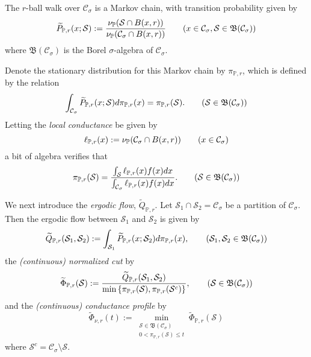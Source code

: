 \documentclass{article}
\newcommand{\set}[1]{\left\{#1\right\}}
\newcommand{\Cset}{\mathcal{C}}
\newcommand{\Sset}{\mathcal{S}}
\newcommand{\Csig}{\Cset_{\sigma}}
\newcommand{\Pbb}{\mathbb{P}}
\newcommand{\1}{\mathbf{1}}
\theoremstyle{alden}
\theoremstyle{aldenthm}
\theoremstyle{remark}
\begin{document}
The $r$-ball walk over $\Csig$ is a Markov chain, with transition probability given by 
\begin{equation*}
\widetilde{P}_{\Pbb,r}(x; \Sset) := \frac{\nu_{\Pbb}(\Sset \cap B(x,r))}{\nu_{\Pbb}(\Csig \cap B(x,r))} \tag{$x \in \Csig, \Sset \in \mathfrak{B}(\Csig)$}
\end{equation*}
where $\mathfrak{B}(\Csig)$ is the Borel $\sigma$-algebra of $\Csig$. 

Denote the stationary distribution for this Markov chain by $\pi_{\Pbb,r}$, which is defined by the relation
\begin{equation*}
\int_{\Csig} \widetilde{P}_{\Pbb,r}(x; \Sset) d\pi_{\Pbb,r}(x) = \pi_{\Pbb,r}(\Sset).  \tag{$\Sset \in \mathfrak{B}(\Csig)$}
\end{equation*}
Letting the \emph{local conductance} be given by
\begin{equation*}
\ell_{\Pbb,r}(x) := \nu_{\Pbb}(\Csig \cap B(x,r)) \tag{$x \in \Csig$}
\end{equation*}
a bit of algebra verifies that
\begin{equation*}
\pi_{\Pbb,r}(\Sset) = \frac{\int_{\Sset} \ell_{\Pbb,r}(x) f(x) dx}{\int_{\Csig} \ell_{\Pbb,r}(x) f(x) dx}. \tag{$\Sset \in \mathfrak{B}(\Csig)$}
\end{equation*}

We next introduce the \emph{ergodic flow}, $\widetilde{Q}_{\Pbb,r}$. Let $\Sset_1 \cap \Sset_2 = \Csig$ be a partition of $\Csig$. Then the ergodic flow between $\Sset_1$ and $\Sset_2$ is given by 
\begin{equation*}
\widetilde{Q}_{\Pbb,r}(\Sset_1, \Sset_2) := \int_{\Sset_1} \widetilde{P}_{\Pbb,r}(x; \Sset_2) d\pi_{\Pbb,r}(x), \tag{$\Sset_1, \Sset_2 \in \mathfrak{B}(\Csig)$}
\end{equation*}
the \emph{(continuous) normalized cut} by
\begin{equation*}
\widetilde{\Phi}_{\Pbb,r}(\Sset) := \frac{\widetilde{Q}_{\Pbb,r}(\Sset_1, \Sset_2)}{\min \set{\pi_{\Pbb,r}(\Sset),\pi_{\Pbb,r}(\Sset^c)}}, \tag{$\Sset \in \mathfrak{B}(\Csig)$}
\end{equation*}
and the \emph{(continuous) conductance profile} by
\begin{equation*}
\widetilde{\Phi}_{\nu,r}(t) := \min_{\substack{\Sset \in \mathfrak{B}(\Csig) \\ 0 < \pi_{\Pbb,r}(\Sset) \leq t} } \widetilde{\Phi}_{\Pbb,r}(\Sset) \tag{$0 < t \leq 1/2 $}
\end{equation*}
where $\Sset^c = \Csig \setminus \Sset$. 
\end{document}
